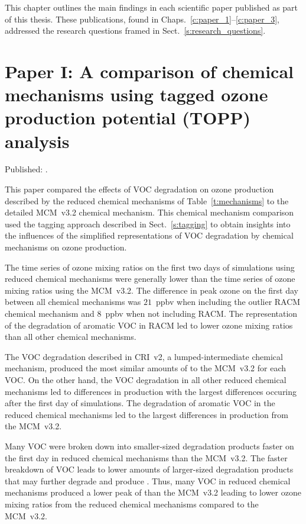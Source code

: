 This chapter outlines the main findings in each scientific paper published as part of this thesis.
These publications, found in Chaps.~\ref{c:paper_1}--\ref{c:paper_3}, addressed the research questions framed in Sect.~\ref{s:research_questions}.

\singlespacing
\section{Paper I: A comparison of chemical mechanisms using tagged ozone production potential (TOPP) analysis} \label{s:chemical_mechanism_results}

\onehalfspacing

\noindent
Published: .

This paper compared the effects of VOC degradation on ozone production described by the reduced chemical mechanisms of Table~\ref{t:mechanisms} to the detailed MCM~v3.2 chemical mechanism.
This chemical mechanism comparison used the tagging approach described in Sect.~\ref{s:tagging} to obtain insights into the influences of the simplified representations of VOC degradation by chemical mechanisms on ozone production.

The time series of ozone mixing ratios on the first two days of simulations using reduced chemical mechanisms were generally lower than the time series of ozone mixing ratios using the MCM~v3.2.
The difference in peak ozone on the first day between all chemical mechanisms was $21$~ppbv when including the outlier RACM chemical mechanism and $8$~ppbv when not including RACM.
The representation of the degradation of aromatic VOC in RACM led to lower ozone mixing ratios than all other chemical mechanisms.

The VOC degradation described in CRI~v2, a lumped-intermediate chemical mechanism, produced the most similar amounts of  to the MCM~v3.2 for each VOC.
On the other hand, the VOC degradation in all other reduced chemical mechanisms led to differences in  production with the largest differences occuring after the first day of simulations.
The degradation of aromatic VOC in the reduced chemical mechanisms led to the largest differences in  production from the MCM~v3.2.

Many VOC were broken down into smaller-sized degradation products faster on the first day in reduced chemical mechanisms than the MCM~v3.2.
The faster breakdown of VOC leads to lower amounts of larger-sized degradation products that may further degrade and produce .
Thus, many VOC in reduced chemical mechanisms produced a lower peak of  than the MCM~v3.2 leading to lower ozone mixing ratios from the reduced chemical mechanisms compared to the MCM~v3.2.

